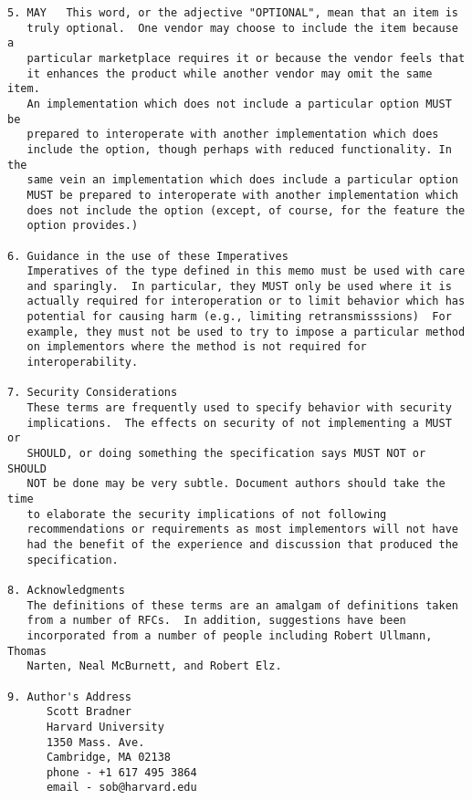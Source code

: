 \begin{verbatim}
5. MAY   This word, or the adjective "OPTIONAL", mean that an item is
   truly optional.  One vendor may choose to include the item because a
   particular marketplace requires it or because the vendor feels that
   it enhances the product while another vendor may omit the same item.
   An implementation which does not include a particular option MUST be
   prepared to interoperate with another implementation which does
   include the option, though perhaps with reduced functionality. In the
   same vein an implementation which does include a particular option
   MUST be prepared to interoperate with another implementation which
   does not include the option (except, of course, for the feature the
   option provides.)

6. Guidance in the use of these Imperatives
   Imperatives of the type defined in this memo must be used with care
   and sparingly.  In particular, they MUST only be used where it is
   actually required for interoperation or to limit behavior which has
   potential for causing harm (e.g., limiting retransmisssions)  For
   example, they must not be used to try to impose a particular method
   on implementors where the method is not required for
   interoperability.

7. Security Considerations
   These terms are frequently used to specify behavior with security
   implications.  The effects on security of not implementing a MUST or
   SHOULD, or doing something the specification says MUST NOT or SHOULD
   NOT be done may be very subtle. Document authors should take the time
   to elaborate the security implications of not following
   recommendations or requirements as most implementors will not have
   had the benefit of the experience and discussion that produced the
   specification.

8. Acknowledgments
   The definitions of these terms are an amalgam of definitions taken
   from a number of RFCs.  In addition, suggestions have been
   incorporated from a number of people including Robert Ullmann, Thomas
   Narten, Neal McBurnett, and Robert Elz.

9. Author's Address
      Scott Bradner
      Harvard University
      1350 Mass. Ave.
      Cambridge, MA 02138
      phone - +1 617 495 3864
      email - sob@harvard.edu
\end{verbatim}
